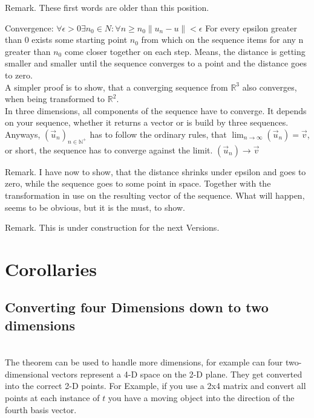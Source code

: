 \documentclass[a4paper]{article}
\begin{document}
Remark. These first words are older than this position.

Convergence: $\forall \epsilon > 0 \exists n_{0} \in N : \forall n \geq n_{0} \|u_{n}-u\| < \epsilon$ For every epsilon greater than 0 exists some starting point $n_{0}$ from which on the sequence items for any n greater than $n_{0}$ come closer together on each step. Means, the distance is getting smaller and smaller until the sequence converges to a point and the distance goes to zero.\\

A simpler proof is to show, that a converging sequence from $\mathbb{R}^{3}$ also converges, when being transformed to $\mathbb{R}^{2}$. \\


In three dimensions, all components of the sequence have to converge. It depends on your sequence, whether it returns a vector or is build by three sequences. Anyways, $(\vec{u}_{n})_{n \in \mathbb{N}^{+} }$ has to follow the ordinary rules, that $\lim_{n\rightarrow\infty}(\vec{u}_{n}) = \vec{v}$, or short, the sequence has to converge against the limit. $(\vec{u}_{n}) \rightarrow \vec{v}$


Remark. I have now to show, that the distance shrinks under epsilon and goes to zero, while the sequence goes to some point in space.
Together with the transformation in use on the resulting vector of the sequence. What will happen, seems to be obvious, but it is the must, to show.


Remark. This is under construction for the next Versions.


\section{Corollaries}

\subsection{Converting four Dimensions down to two dimensions}\\

The theorem can be used to handle more dimensions, for example can four two-dimensional
vectors represent a 4-D space on the 2-D plane. They get converted into the correct
2-D points. For Example, if you use a 2x4 matrix and convert all points at each 
instance of $t$ you have a moving object into the direction of the fourth basis vector. \\
\end{document}
